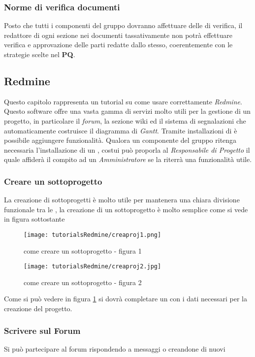 \documentclass{scalatekids-article}
\begin{document}
\subsubsection{Norme di verifica documenti}
Posto che tutti i componenti del gruppo dovranno affettuare delle  di
verifica, il redattore di ogni sezione nei documenti tassativamente non potrà
effettuare verifica e approvazione delle parti redatte dallo stesso,
coerentemente con le strategie scelte nel \textbf{PQ}.

\subsection{Redmine}
Questo capitolo rappresenta un tutorial su come usare correttamente \textit{Redmine}.
Questo software offre una vasta gamma di servizi molto utili per la gestione di un progetto, in particolare il \textit{forum}, la sezione wiki ed il sistema di segnalazioni che automaticamente costruisce il diagramma di \textit{Gantt}. Tramite installazioni di  è possibile aggiungere funzionalità. Qualora un componente del gruppo ritenga necessaria l'installazione di un , costui può proporla al \textit{Responsabile di Progetto} il quale affiderà il compito ad un \textit{Amministratore} se la riterrà una funzionalità utile.
\subsubsection{Creare un sottoprogetto}
La creazione di sottoprogetti è molto utile per mantenera una chiara divisione funzionale tra le , la creazione di un sottoprogetto è molto semplice come si vede in figura sottostante
\begin{figure}[H]
  \centering
  \texttt{[image: tutorialsRedmine/creaproj1.png]}
  \caption{come creare un sottoprogetto - figura 1}
\end{figure}
\begin{figure}[H]
  \centering
  \texttt{[image: tutorialsRedmine/creaproj2.jpg]}
  \caption{come creare un sottoprogetto - figura 2\label{fig:figura-2}}
\end{figure}
Come si può vedere in figura \ref{fig:figura-2} si dovrà completare un  con i dati necessari per la creazione del progetto.
\subsubsection{Scrivere sul Forum}
Si può partecipare al forum rispondendo a messaggi o creandone di nuovi
\end{document}

